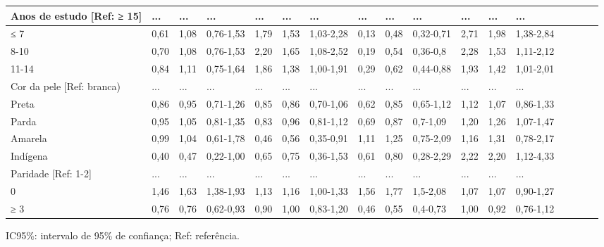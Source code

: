\documentclass{article}
\begin{document}
\begin{table}
\begin{xtabular}{ l | l | l | l | l l | l | l | l | l | l | l | l | l | l | l |
l }
Anos de estudo [Ref: ≥ 15]
& ...
& ...
& ...
& ...
& ...
& ...
& ...
& ...
& ...
& ...
& ...
& ...
\\ \hline

≤ 7
& 0,61
& 1,08
& 0,76-1,53
& 1,79
& 1,53
& 1,03-2,28
& 0,13
& 0,48
& 0,32-0,71
& 2,71
& 1,98
& 1,38-2,84
\\ \hline

8-10
& 0,70
& 1,08
& 0,76-1,53
& 2,20
& 1,65
& 1,08-2,52
& 0,19
& 0,54
& 0,36-0,8
& 2,28
& 1,53
& 1,11-2,12
\\ \hline

11-14
& 0,84
& 1,11
& 0,75-1,64
& 1,86
& 1,38
& 1,00-1,91
& 0,29
& 0,62
& 0,44-0,88
& 1,93
& 1,42
& 1,01-2,01
\\ \hline

Cor da pele [Ref: branca)
& ...
& ...
& ...
& ...
& ...
& ...
& ...
& ...
& ...
& ...
& ...
& ...
\\ \hline

Preta
& 0,86
& 0,95
& 0,71-1,26
& 0,85
& 0,86
& 0,70-1,06
& 0,62
& 0,85
& 0,65-1,12
& 1,12
& 1,07
& 0,86-1,33
\\ \hline

Parda
& 0,95
& 1,05
& 0,81-1,35
& 0,83
& 0,96
& 0,81-1,12
& 0,69
& 0,87
& 0,7-1,09
& 1,20
& 1,26
& 1,07-1,47
\\ \hline

Amarela
& 0,99
& 1,04
& 0,61-1,78
& 0,46
& 0,56
& 0,35-0,91
& 1,11
& 1,25
& 0,75-2,09
& 1,16
& 1,31
& 0,78-2,17
\\ \hline

Indígena
& 0,40
& 0,47
& 0,22-1,00
& 0,65
& 0,75
& 0,36-1,53
& 0,61
& 0,80
& 0,28-2,29
& 2,22
& 2,20
& 1,12-4,33
\\ \hline

Paridade [Ref: 1-2]
& ...
& ...
& ...
& ...
& ...
& ...
& ...
& ...
& ...
& ...
& ...
& ...
\\ \hline

0
& 1,46
& 1,63
& 1,38-1,93
& 1,13
& 1,16
& 1,00-1,33
& 1,56
& 1,77
& 1,5-2,08
& 1,07
& 1,07
& 0,90-1,27
\\ \hline

≥ 3
& 0,76
& 0,76
& 0,62-0,93
& 0,90
& 1,00
& 0,83-1,20
& 0,46
& 0,55
& 0,4-0,73
& 1,00
& 0,92
& 0,76-1,12
\\ \hline

\end{xtabular}
\end{table}

IC95\%: intervalo de 95\% de confiança; Ref: referência.
\end{document}
